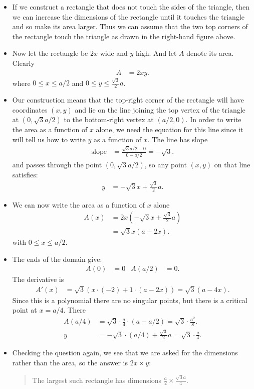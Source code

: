 \begin{eg}
\begin{itemize}
\item If we construct a rectangle that does not touch the sides of the
triangle, then we can increase the dimensions of the rectangle until it touches
the triangle and so make its area larger. Thus we can assume that the
two top corners of the rectangle touch the triangle as drawn in the
right-hand figure above.

\item Now let the rectangle be $2x$ wide and $y$ high. And let $A$ denote its
area. Clearly
\begin{align*}
  A &= 2xy.
\end{align*}
where $0 \leq x \leq a/2$ and $0\leq y\leq \frac{\sqrt{3}}{2}a$.


\item Our construction means that the top-right corner of the rectangle will
have coordinates $(x,y)$ and lie on the line joining the top vertex of the
triangle at $(0,\sqrt{3}a/2)$ to the bottom-right vertex at $(a/2,0)$. In order
to write the area as a function of $x$ alone, we need the equation for this
line since it will tell us how to write $y$ as a function of $x$. The line has
slope
\begin{align*}
  \text{slope} &= \frac{\sqrt{3}a/2 - 0}{0-a/2} = -\sqrt{3}.
\end{align*}
and passes through the point $(0,\sqrt{3}a/2)$, so any point $(x,y)$ on that
line satisfies:
\begin{align*}
  y &= -\sqrt{3}x + \frac{\sqrt{3}}{2}a.
\end{align*}
\item We can now write the area as a function of $x$ alone
\begin{align*}
  A(x) &= 2x \left( -\sqrt{3}x + \frac{\sqrt{3}}{2}a \right)\\
  &= \sqrt{3} x(a-2x).
\end{align*}
with $0\leq x \leq a/2$.
\item The ends of the domain give:
\begin{align*}
  A(0) &= 0 & A(a/2) &= 0.
\end{align*}
The derivative is
\begin{align*}
  A'(x) &= \sqrt{3} \left( x \cdot (-2) + 1 \cdot (a-2x) \right) = \sqrt{3}
(a-4x).
\end{align*}
Since this is a polynomial there are no singular points, but there is a
critical point at $x=a/4$. There
\begin{align*}
  A(a/4) &= \sqrt{3} \cdot \frac{a}{4} \cdot (a - a/2) = \sqrt{3} \cdot
\frac{a^2}{8}. \\
  y &= -\sqrt{3}\cdot (a/4) + \frac{\sqrt{3}}{2} a = \sqrt{3}\cdot \frac{a}{4}.
\end{align*}
\item Checking the question again, we see that we are asked for the dimensions
rather than the area, so the answer is $2x \times y$:
\begin{quote}
 The largest such rectangle has dimensions $\frac{a}{2} \times \frac{\sqrt{3}
a}{4}$.
\end{quote}


\end{itemize}
\end{eg}
